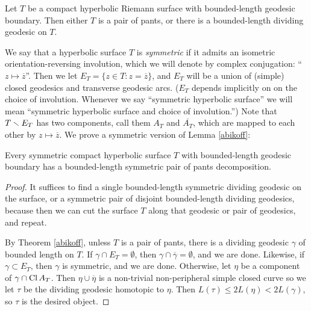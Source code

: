 \begin{lem} \label{abikoff}
Let $T$ be a compact hyperbolic Riemann surface with bounded-length geodesic boundary.
Then either $T$ is a pair of pants,
or there is a bounded-length dividing geodesic on $T$.
\end{lem}

We say that a hyperbolic surface $T$ is \emph{symmetric}
 if it admits an isometric orientation-reversing involution,
which we will denote by complex conjugation: ``$z \mapsto \overline z$''.
Then we let $E_T = \{ z \in T : z = \overline z \}$,
 and $E_T$ will be a union of (simple) closed geodesics and transverse geodesic arcs.
($E_T$ depends implicitly on on the choice of involution.
Whenever we say ``symmetric hyperbolic surface'' we will mean
 ``symmetric hyperbolic surface and choice of involution.'')
Note that $T \smallsetminus E_T$ has two components,
call them $A_T$ and $\overline{A_T}$,
which are mapped to each other by $z \mapsto \overline z$.
We prove a symmetric version of Lemma \ref{abikoff}:

\begin{lem} \label{symmetric abikoff}
Every symmetric compact hyperbolic surface $T$ with \break bounded-length geodesic boundary
 has a bounded-length symmetric pair of pants decomposition.
\end{lem}
\begin{proof}
It suffices to find a single bounded-length symmetric dividing geodesic on the surface,
or a symmetric pair of disjoint bounded-length dividing geodesics,
because then we can cut the surface $T$ along that geodesic or pair of geodesics,
and repeat.

By Theorem \ref{abikoff},
unless $T$ is a pair of pants,
there is a dividing geodesic $\gamma$ of bounded length on $T$.
If $\gamma \cap E_T = \emptyset$,
then $\gamma \cap \overline \gamma = \emptyset$,
and we are done.
Likewise, if $\gamma \subset E_T$,
then $\gamma$ is symmetric,
and we are done.
Otherwise,
let $\eta$ be a component of $\gamma \cap \operatorname{Cl} A_T$.
Then $\eta \cup \overline \eta$
is a non-trivial non-peripheral simple closed curve
so we let $\tau$ be the dividing
 geodesic homotopic to $\eta$.
Then $L(\tau) \le 2 L(\eta) < 2 L(\gamma)$,
so $\tau$ is the desired object.
\end{proof}

